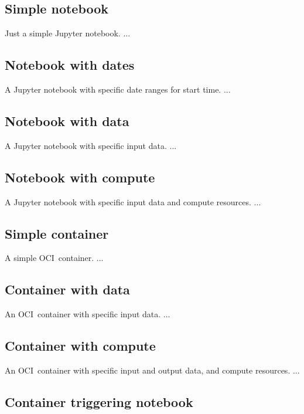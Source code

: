 \documentclass[11pt,a4paper]{ivoa}
\newcommand{\jupyter} {Jupyter}
\newcommand{\jupyternotebook} {Jupyter notebook}
\newcommand{\ocicontainer} {OCI~container}
\begin{document}
\subsection{Simple notebook}
\label{simple-notebook}

Just a simple \jupyternotebook{}.
...

\subsection{Notebook with dates}
\label{notebook-with-dates}

A \jupyter{} notebook with specific date ranges for start time.
...

\subsection{Notebook with data}
\label{notebook-with-data}

A \jupyternotebook{} with specific input data.
...

\subsection{Notebook with compute}
\label{notebook-with-compute}

A \jupyternotebook{} with specific input data and compute resources.
...

\subsection{Simple container}
\label{simple-container}

A simple \ocicontainer{}.
...

\subsection{Container with data}
\label{container-with-data}

An \ocicontainer{} with specific input data.
...

\subsection{Container with compute}
\label{container-with-compute}

An \ocicontainer{} with specific input and output data, and compute resources.
...

\subsection{Container triggering notebook}
\label{container-triggering-notebook}
\end{document}
